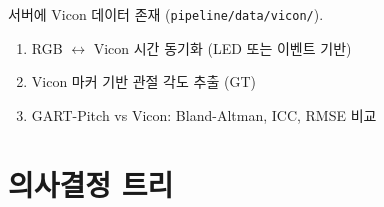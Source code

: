 \documentclass[11pt, a4paper]{report}
\begin{document}
\begin{pipelinebox}[title={C2. Vicon 검증 (1--2일)}]
서버에 Vicon 데이터 존재 (\texttt{pipeline/data/vicon/}).
\begin{enumerate}[leftmargin=*]
  \item RGB $\leftrightarrow$ Vicon 시간 동기화 (LED 또는 이벤트 기반)
  \item Vicon 마커 기반 관절 각도 추출 (GT)
  \item GART-Pitch vs Vicon: Bland-Altman, ICC, RMSE 비교
\end{enumerate}
\end{pipelinebox}


\chapter{의사결정 트리}
\end{document}
